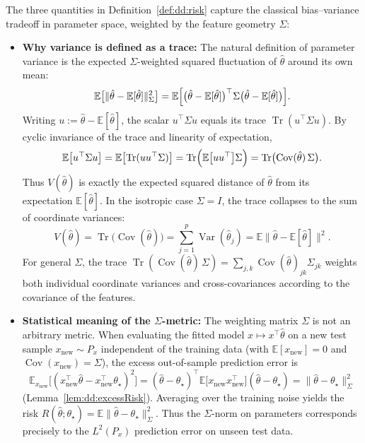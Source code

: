 \begin{remark}\label{rmk:dd:riskIntuition}
The three quantities in Definition~\ref{def:dd:risk} capture the classical bias--variance tradeoff in parameter space, weighted by the feature geometry $\Sigma$:
\begin{itemize}
  \item \textbf{Why variance is defined as a trace:}
  The natural definition of parameter variance is the expected $\Sigma$-weighted squared fluctuation of $\hat\theta$ around its own mean:
  \[
    \mathbb E\bigl[\|\hat\theta-\mathbb E[\hat\theta]\|_\Sigma^2\bigr] = \mathbb E\Bigl[\bigl(\hat\theta-\mathbb E[\hat\theta]\bigr)^\top\Sigma\bigl(\hat\theta-\mathbb E[\hat\theta]\bigr)\Bigr].
  \]
  Writing $u:=\hat\theta-\mathbb E[\hat\theta]$, the scalar $u^\top\Sigma u$ equals its trace $\operatorname{Tr}(u^\top\Sigma u)$. By cyclic invariance of the trace and linearity of expectation,
  \[
    \mathbb E\bigl[u^\top\Sigma u\bigr] = \mathbb E\bigl[\operatorname{Tr}(uu^\top\Sigma)\bigr] = \operatorname{Tr}\Bigl(\mathbb E\bigl[uu^\top\bigr]\Sigma\Bigr) = \operatorname{Tr}\bigl(\operatorname{Cov}(\hat\theta)\,\Sigma\bigr).
  \]
  Thus $V(\hat\theta)$ is exactly the expected squared distance of $\hat\theta$ from its expectation $\mathbb E[\hat\theta]$. In the isotropic case $\Sigma=I$, the trace collapses to the sum of coordinate variances:
  \[
    V(\hat\theta) = \operatorname{Tr}\bigl(\operatorname{Cov}(\hat\theta)\bigr) = \sum_{j=1}^p\operatorname{Var}(\hat\theta_j) = \mathbb E\|\hat\theta-\mathbb E[\hat\theta]\|^2.
  \]
  For general $\Sigma$, the trace $\operatorname{Tr}(\operatorname{Cov}(\hat\theta)\,\Sigma)=\sum_{j,k}\operatorname{Cov}(\hat\theta)_{jk}\Sigma_{jk}$ weights both individual coordinate variances and cross-covariances according to the covariance of the features.

  \item \textbf{Statistical meaning of the $\Sigma$-metric:}
  The weighting matrix $\Sigma$ is not an arbitrary metric. When evaluating the fitted model $x\mapsto x^\top\hat\theta$ on a new test sample $x_{\mathrm{new}}\sim P_x$ independent of the training data (with $\mathbb E[x_{\mathrm{new}}]=0$ and $\operatorname{Cov}(x_{\mathrm{new}})=\Sigma$), the excess out-of-sample prediction error is
  \[
    \mathbb E_{x_{\mathrm{new}}}\bigl[(x_{\mathrm{new}}^\top\hat\theta - x_{\mathrm{new}}^\top\theta_\star)^2\bigr] = (\hat\theta-\theta_\star)^\top\mathbb E\bigl[x_{\mathrm{new}}x_{\mathrm{new}}^\top\bigr](\hat\theta-\theta_\star) = \|\hat\theta-\theta_\star\|_\Sigma^2
  \]
  (Lemma~\ref{lem:dd:excessRisk}). Averaging over the training noise yields the risk $R(\hat\theta;\theta_\star)=\mathbb E\|\hat\theta-\theta_\star\|_\Sigma^2$. Thus the $\Sigma$-norm on parameters corresponds precisely to the $L^2(P_x)$ prediction error on unseen test data.


\end{itemize}
\end{remark}

